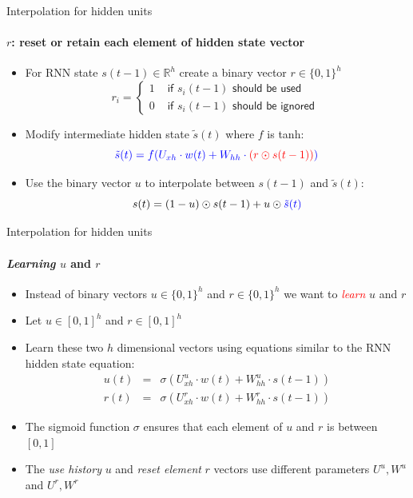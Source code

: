 \begin{frame}{Interpolation for hidden units}
\framesubtitle{$r$: reset or retain each element of hidden state vector}
\begin{itemize}[<+->]
	\item For RNN state $s(t-1) \in \mathbb{R}^h$ create a binary vector $r \in \{0,1\}^h$
	\[ r_i = \left\{ \begin{array}{cl}
		1 & \textsf{ if $s_i(t-1)$ should be used }\\
		0 & \textsf{ if $s_i(t-1)$ should be ignored }
	\end{array} \right. \]
	\item Modify intermediate hidden state $\tilde{s}(t)$ where $f$ is tanh: 
	\[ \textcolor{blue}{\tilde{s}(t) = f(U_{xh} \cdot w(t) + W_{hh} \cdot \textcolor{red}{\left( r \odot s(t-1) \right)})} \]
	\item Use the binary vector $u$ to interpolate between $s(t-1)$ and $\tilde{s}(t)$:
	\[ s(t) = (1-u) \odot s(t-1) + u \odot \textcolor{blue}{\tilde{s}(t)} \]
\end{itemize}
\end{frame}

\begin{frame}{Interpolation for hidden units}
\framesubtitle{{\it Learning} $u$ and $r$}
\begin{itemize}[<+->]
	\item Instead of binary vectors $u \in \{0,1\}^h$ and $r \in \{0,1\}^h$ we want to \textcolor{red}{{\em learn}} $u$ and $r$
	\item Let $u \in [0,1]^h$ and $r \in [0,1]^h$
	\item Learn these two $h$ dimensional vectors using equations similar to the RNN hidden state equation:
	\begin{eqnarray*}
		u(t) &=& \sigma\left( U^u_{xh} \cdot w(t) + W^u_{hh} \cdot s(t-1) \right)  \\
		r(t) &=& \sigma\left( U^r_{xh} \cdot w(t) + W^r_{hh} \cdot s(t-1) \right)
	\end{eqnarray*}
	\item The sigmoid function $\sigma$ ensures that each element of $u$ and $r$ is between $[0,1]$
	\item The {\it use history} $u$ and {\it reset element} $r$ vectors use different parameters $U^u, W^u$ and $U^r, W^r$
\end{itemize}
\end{frame}

